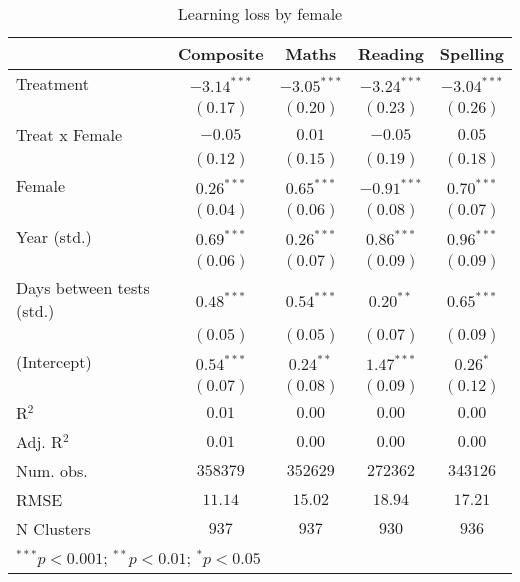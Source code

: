 
\begin{table}
\begin{center}
\begin{tabular}{l c c c c}
\hline
 & Composite & Maths & Reading & Spelling \\
\hline
Treatment                 & $-3.14^{***}$ & $-3.05^{***}$ & $-3.24^{***}$ & $-3.04^{***}$ \\
                          & $(0.17)$      & $(0.20)$      & $(0.23)$      & $(0.26)$      \\
Treat x Female            & $-0.05$       & $0.01$        & $-0.05$       & $0.05$        \\
                          & $(0.12)$      & $(0.15)$      & $(0.19)$      & $(0.18)$      \\
Female                    & $0.26^{***}$  & $0.65^{***}$  & $-0.91^{***}$ & $0.70^{***}$  \\
                          & $(0.04)$      & $(0.06)$      & $(0.08)$      & $(0.07)$      \\
Year (std.)               & $0.69^{***}$  & $0.26^{***}$  & $0.86^{***}$  & $0.96^{***}$  \\
                          & $(0.06)$      & $(0.07)$      & $(0.09)$      & $(0.09)$      \\
Days between tests (std.) & $0.48^{***}$  & $0.54^{***}$  & $0.20^{**}$   & $0.65^{***}$  \\
                          & $(0.05)$      & $(0.05)$      & $(0.07)$      & $(0.09)$      \\
(Intercept)               & $0.54^{***}$  & $0.24^{**}$   & $1.47^{***}$  & $0.26^{*}$    \\
                          & $(0.07)$      & $(0.08)$      & $(0.09)$      & $(0.12)$      \\
\hline
R$^2$                     & $0.01$        & $0.00$        & $0.00$        & $0.00$        \\
Adj. R$^2$                & $0.01$        & $0.00$        & $0.00$        & $0.00$        \\
Num. obs.                 & $358379$      & $352629$      & $272362$      & $343126$      \\
RMSE                      & $11.14$       & $15.02$       & $18.94$       & $17.21$       \\
N Clusters                & $937$         & $937$         & $930$         & $936$         \\
\hline
\multicolumn{5}{l}{\scriptsize{$^{***}p<0.001$; $^{**}p<0.01$; $^{*}p<0.05$}}
\end{tabular}
\caption{Learning loss by female}
\label{tablefemale}
\end{center}
\end{table}
